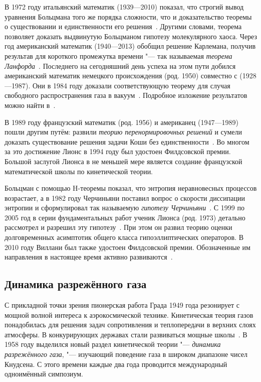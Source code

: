 \documentclass[a4paper, 12pt, oneside]{article} %
\begin{document}
В 1972 году итальянский математик 
(1939---2010) показал, что строгий вывод уравнения Больцмана того же
порядка сложности, что и доказательство теоремы о существовании и
единственности его решения~\cite{cercignani1972boltzmann}. Другими
словами, теорема позволяет доказать выдвинутую Больцманом гипотезу
молекулярного хаоса. Через год американский математик  (1940---2013) обобщил решение Карлемана, получив результав для
короткого промежутка времени "--- так называемая \emph{теорема
Ланфорда}~\cite{lanford1975time}. Последнего на сегодняшний день успеха
на этом пути добился американский математик немецкого происхождения
 (род. 1950) совместно с  (1928---1987). Они в 1984 году доказали соответствующую
теорему для случая свободного распространения газа в
вакуум~\cite{illner1984boltzmann}. Подробное изложение результатов
можно найти в~\cite{cercignani1994mathematical}.

В 1989 году французский математик  (род. 1956) и
американец  (1947---1989) пошли другим путём:
развили \emph{теорию перенормировочных решений} и сумели доказать
существование решения задачи Коши без
единственности~\cite{diperna1989cauchy}. Во многом за это достижение
Лионс в 1994 году был удостоен Филдсовской премии. Большой заслугой
Лионса в не меньшей мере является создание французской математической
школы по кинетической теории.

Больцман с помощью H-теоремы показал, что энтропия неравновесных
процессов возрастает, а в 1982 году Черчиньяни поставил вопрос о
скорости диссипации энтропии и сформулировал так называемую
\emph{гипотезу Черчиньяни}~\cite{cercignani1982conjecture}. С 1999 по
2005 год в серии фундаментальных работ ученик Лионса  (род. 1973) детально рассмотрел и разрешил эту
гипотезу~\cite{yau2010work}. При этом он развил теорию оценки
долговременных асимптотик общего класса гипоэллиптических операторов. В
2010 году Виллани был также удостоен Филдсовской премии. Обозначенные им
направления в настоящее время активно развиваются~\cite{villani2002review}.

\subsection{Динамика разрежённого газа}

С прикладной точки зрения пионерская работа Града 1949 года резонирует с
мощной волной интереса к аэрокосмической технике. Кинетическая теория
газов понадобилась для решения задач сопротивления и теплопередачи в
верхних слоях атмосферы. В конкурирующих державах стали развиваться
мощные школы~\cite{grad1958principles, kogan1967dynamics}. В 1958 году
выделился новый раздел кинетической теории "--- \emph{динамика
разрежённого газа}, "--- изучающий поведение газа в широком диапазоне чисел Кнудсена.
С этого времени каждые два года проводится международный
одноимённый симпозиум.
\end{document}
